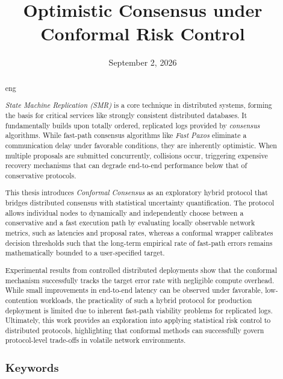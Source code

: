 \documentclass[english,bibtex]{kththesis}
\date{September 2, 2026}
\title{Optimistic Consensus under Conformal Risk Control}
\numberwithin{algorithm}{chapter}
\begin{document}


\kthcover

\clearpage
\thispagestyle{empty}
\mbox{}

\titlepage
\bookinfopage

\frontmatter
\setcounter{page}{1}

\begin{abstract}
    \markboth{\abstractname}{}

    \begin{scontents}[store-env=lang]
        eng
    \end{scontents}

    \begin{scontents}[store-env=abstracts,print-env=true]
        \textit{State Machine Replication (SMR)} is a core technique in distributed systems, forming the basis for critical services like strongly consistent distributed databases. It fundamentally builds upon totally ordered, replicated logs provided by \textit{consensus} algorithms. While fast-path consensus algorithms like \textit{Fast Paxos} eliminate a communication delay under favorable conditions, they are inherently optimistic. When multiple proposals are submitted concurrently, collisions occur, triggering expensive recovery mechanisms that can degrade end-to-end performance below that of conservative protocols.

        This thesis introduces \textit{Conformal Consensus} as an exploratory hybrid protocol that bridges distributed consensus with statistical uncertainty quantification. The protocol allows individual nodes to dynamically and independently choose between a conservative and a fast execution path by evaluating locally observable network metrics, such as latencies and proposal rates, whereas a conformal wrapper calibrates decision thresholds such that the long-term empirical rate of fast-path errors remains mathematically bounded to a user-specified target.

        Experimental results from controlled distributed deployments show that the conformal mechanism successfully tracks the target error rate with negligible compute overhead. While small improvements in end-to-end latency can be observed under favorable, low-contention workloads, the practicality of such a hybrid protocol for production deployment is limited due to inherent fast-path viability problems for replicated logs. Ultimately, this work provides an exploration into applying statistical risk control to distributed protocols, highlighting that conformal methods can successfully govern protocol-level trade-offs in volatile network environments.
    \end{scontents}

    \subsection*{Keywords}

    \begin{scontents}[store-env=keywords,print-env=true]
    \end{scontents}
\end{abstract}
\end{document}

